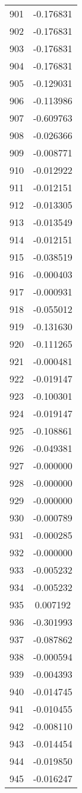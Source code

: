 \documentclass[12pt]{article}
\begin{document}
\begin{longtable}{@{}cc@{}}
901 & -0.176831 \\
902 & -0.176831 \\
903 & -0.176831 \\
904 & -0.176831 \\
905 & -0.129031 \\
906 & -0.113986 \\
907 & -0.609763 \\
908 & -0.026366 \\
909 & -0.008771 \\
910 & -0.012922 \\
911 & -0.012151 \\
912 & -0.013305 \\
913 & -0.013549 \\
914 & -0.012151 \\
915 & -0.038519 \\
916 & -0.000403 \\
917 & -0.000931 \\
918 & -0.055012 \\
919 & -0.131630 \\
920 & -0.111265 \\
921 & -0.000481 \\
922 & -0.019147 \\
923 & -0.100301 \\
924 & -0.019147 \\
925 & -0.108861 \\
926 & -0.049381 \\
927 & -0.000000 \\
928 & -0.000000 \\
929 & -0.000000 \\
930 & -0.000789 \\
931 & -0.000285 \\
932 & -0.000000 \\
933 & -0.005232 \\
934 & -0.005232 \\
935 & 0.007192 \\
936 & -0.301993 \\
937 & -0.087862 \\
938 & -0.000594 \\
939 & -0.004393 \\
940 & -0.014745 \\
941 & -0.010455 \\
942 & -0.008110 \\
943 & -0.014454 \\
944 & -0.019850 \\
945 & -0.016247 \\

\end{longtable}
\end{document}
